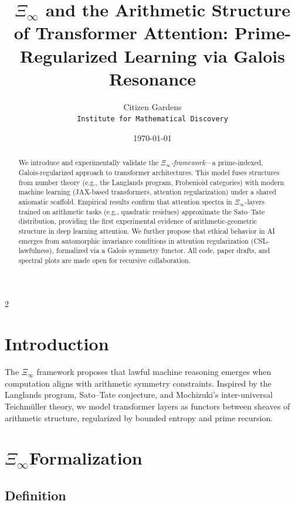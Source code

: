 \documentclass[12pt]{article}
\title{$\Xi_\infty$ and the Arithmetic Structure of Transformer Attention: Prime-Regularized Learning via Galois Resonance}
\author{Citizen Gardens\\ \small{\texttt{Institute for Mathematical Discovery}}}
\date{\today}
\begin{document}
\maketitle

\begin{abstract}
We introduce and experimentally validate the \emph{$\Xi_\infty$-framework}—a prime-indexed, Galois-regularized approach to transformer architectures. This model fuses structures from number theory (e.g., the Langlands program, Frobenioid categories) with modern machine learning (JAX-based transformers, attention regularization) under a shared axiomatic scaffold. Empirical results confirm that attention spectra in $\Xi_\infty$-layers trained on arithmetic tasks (e.g., quadratic residues) approximate the Sato–Tate distribution, providing the first experimental evidence of arithmetic-geometric structure in deep learning attention. We further propose that ethical behavior in AI emerges from automorphic invariance conditions in attention regularization (CSL-lawfulness), formalized via a Galois symmetry functor. All code, paper drafts, and spectral plots are made open for recursive collaboration.
\end{abstract}

\newpage
 \begin{multicols}{2}
\begin{singlespace}
\tableofcontents
\end{singlespace}
\end{multicols}

\section{Introduction}

The $\Xi_\infty$ framework proposes that lawful machine reasoning emerges when computation aligns with arithmetic symmetry constraints. Inspired by the Langlands program, Sato–Tate conjecture, and Mochizuki's inter-universal Teichmüller theory, we model transformer layers as functors between sheaves of arithmetic structure, regularized by bounded entropy and prime recursion.

\section{$\Xi_\infty$Formalization}

\subsection{Definition}
\end{document}
